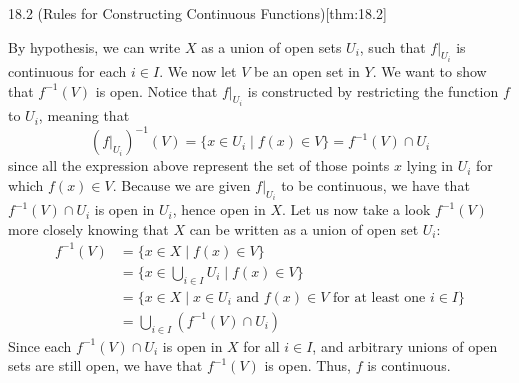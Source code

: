 \begin{thmBox}{18.2 (Rules for Constructing Continuous Functions)}[thm:18.2]
\begin{proofBox}
        By hypothesis, we can write \( X \) as a union of open sets 
        \( U_{ i } \), such that \( f \vert_{ U_{ i } } \) is continuous for 
        each \( i \in I \).
        We now let \( V \) be an open set in \( Y \).
        We want to show that \( f^{ -1 } ( V ) \) is  open.
        Notice that \( f \vert_{ U_{ i } } \) is constructed by restricting the
        function \( f \) to \( U_{ i } \), meaning that 
        \begin{equation*}
            ( f \vert_{ U_{ i } } )^{ -1 } ( V )
            =
            \{ x \in U_{ i } \mid f ( x ) \in V \}
            =
            f^{ -1 } ( V ) \cap U_{ i }
        \end{equation*}
        since all the expression above represent the set of those points \( x \)
        lying in \( U_{ i } \) for which \( f ( x ) \in V \).
        Because we are given \( f \vert_{ U_{ i } } \) to be continuous,
        we have that \( f^{ -1 } ( V ) \cap U_{ i } \) is open in \( U_{ i } \),
        hence open in \( X \).
        Let us now take a look \( f^{ -1 } ( V ) \) more closely knowing that
        \( X \) can be written as a union of open set \( U_{ i } \):
        \begin{equation*}
            \begin{aligned}
                f^{ -1 } ( V )
                &=
                \{ x \in X \mid f ( x ) \in V \}
                \\
                &=
                \{ x \in \bigcup_{ i \in I } U_{ i } \mid f ( x ) \in V \}
                \\
                &=
                \{ x \in X \mid x \in U_{ i } \text{ and } f ( x ) \in V 
                \text{ for at least one } i \in I \}
                \\
                &=
                \bigcup_{ i \in I } ( f^{ -1 } ( V ) \cap U_{ i } )
            \end{aligned}
        \end{equation*}
        Since each \( f^{ -1 } ( V ) \cap U_{ i } \) is open in \( X \) for all
        \( i \in I \), and arbitrary unions of open sets are still open, we have
        that \( f^{ -1 } ( V ) \) is open.
        Thus, \( f \) is continuous.
    \end{proofBox}
\end{thmBox}


